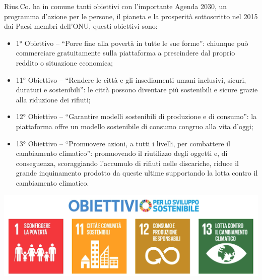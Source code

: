 Rius.Co. ha in comune tanti obiettivi con l'importante Agenda 2030, un programma d'azione per le persone, il pianeta e la prosperità sottoscritto nel 2015 dai Paesi membri dell'ONU, questi obiettivi sono: 
\begin{itemize}
\item 1° Obiettivo – “Porre fine alla povertà in tutte le sue forme”: chiunque può commerciare gratuitamente sulla piattaforma a prescindere dal proprio reddito o situazione economica; 
\item 11° Obiettivo – “Rendere le città e gli insediamenti umani inclusivi, sicuri, duraturi e sostenibili”: le città possono diventare più sostenibili e sicure grazie alla riduzione dei rifiuti; 
\item 12° Obiettivo – “Garantire modelli sostenibili di produzione e di consumo”: la piattaforma offre un modello sostenibile di consumo congruo alla vita d'oggi; 
\item 13° Obiettivo – “Promuovere azioni, a tutti i livelli, per combattere il cambiamento climatico”: promuovendo il riutilizzo degli oggetti e, di conseguenza, scoraggiando l'accumulo di rifiuti nelle discariche, riduce il grande inquinamento prodotto da queste ultime supportando la lotta contro il cambiamento climatico. 
\end{itemize}
\smallskip
\centering\includegraphics[scale=0.11]{images/agenda_2030.png}
\clearpage
